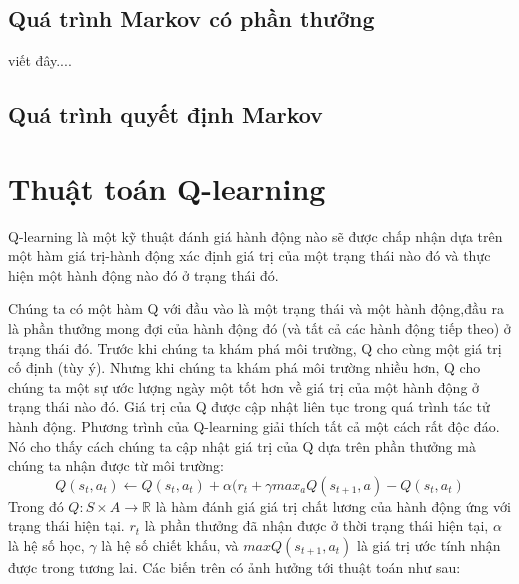 \documentclass[14pt,a4paper,oneside]{report}		%
\begin{document}
\subsection{Quá trình Markov có phần thưởng}
viết đây....
\subsection{Quá trình quyết định Markov}
\section{Thuật toán Q-learning}
Q-learning là một kỹ thuật đánh giá hành động nào sẽ được chấp nhận dựa trên một hàm giá trị-hành động xác định giá trị của một trạng thái nào đó và thực hiện một hành động nào đó ở trạng thái đó. 

Chúng ta có một hàm Q với đầu vào là một trạng thái và một hành động,đầu ra là phần thưởng mong đợi của hành động đó (và tất cả các hành động tiếp theo) ở trạng thái đó. Trước khi chúng ta khám phá môi trường, Q cho cùng một giá trị cố định (tùy ý). Nhưng khi chúng ta khám phá môi trường nhiều hơn, Q cho chúng ta một sự ước lượng ngày một tốt hơn về giá trị của một hành động ở trạng thái nào đó. Giá trị của Q được cập nhật liên tục trong quá trình tác tử hành động. 
	Phương trình của Q-learning giải thích tất cả một cách rất độc đáo. Nó cho thấy cách chúng ta cập nhật giá trị của Q dựa trên phần thưởng mà chúng ta nhận được từ môi trường:
\begin{equation}
Q(s_t,a_t) \leftarrow Q(s_t,a_t)+\alpha(r_t+\gamma max_{a}Q(s_{t+1},a) - Q(s_t,a_t)
\end{equation}
Trong đó $Q:S \times A \rightarrow \mathbb{R}$ là hàm đánh giá giá trị chất lương của hành động ứng với trạng thái hiện tại. $r_t$ là phần thưởng đã nhận được ở thời trạng thái hiện tại, $\alpha$ là hệ số học, $\gamma$ là hệ số chiết khấu, và $maxQ(s_{t+1},a_t)$ là giá trị ước tính nhận được trong tương lai. Các biến trên có ảnh hưởng tới thuật toán như sau:
\end{document}
